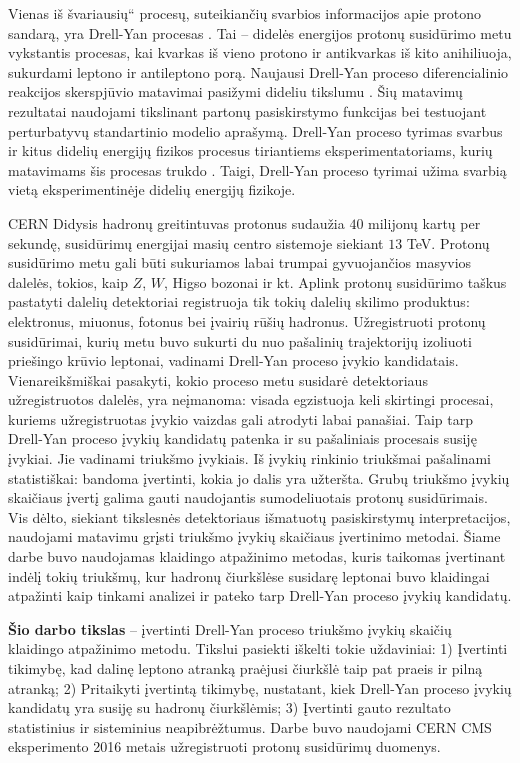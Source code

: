 \documentclass[a4paper, 12pt, oneside]{article}
\newcommand{\ltq}[1]{{\quotedblbase{}#1\textquotedblleft{}}}
\newlength\q
\begin{document}
Vienas iš \ltq{švariausių} procesų, suteikiančių svarbios informacijos apie protono sandarą, yra
Drell-Yan procesas \cite{DYoriginal}.
Tai -- didelės energijos protonų susidūrimo metu vykstantis procesas, kai kvarkas iš vieno protono ir antikvarkas
iš kito anihiliuoja, sukurdami leptono ir antileptono porą.
Naujausi Drell-Yan proceso diferencialinio reakcijos skerspjūvio matavimai pasižymi dideliu tikslumu
\cite{DY_CMS2013, DY_ATLAS2013, DY_ATLAS2014, DY_CMS2015, DY_ATLAS2016, DY_ATLAS2017, DY_CMS2019}.
Šių matavimų rezultatai naudojami tikslinant partonų pasiskirstymo funkcijas bei testuojant perturbatyvų standartinio
modelio aprašymą.
Drell-Yan proceso tyrimas svarbus ir kitus didelių energijų fizikos procesus tiriantiems eksperimentatoriams,
kurių matavimams šis procesas trukdo \cite{Higgs2018, Zprime, SUSYtau}.
Taigi, Drell-Yan proceso tyrimai užima svarbią vietą eksperimentinėje didelių energijų fizikoje.

CERN Didysis hadronų greitintuvas protonus sudaužia $40$ milijonų kartų per sekundę, susidūrimų energijai masių
centro sistemoje siekiant $13$ TeV.
Protonų susidūrimo metu gali būti sukuriamos labai trumpai gyvuojančios masyvios dalelės, tokios, kaip
$Z$, $W$, Higso bozonai ir kt.
Aplink protonų susidūrimo taškus pastatyti dalelių detektoriai registruoja tik tokių dalelių skilimo produktus:
elektronus, miuonus, fotonus bei įvairių rūšių hadronus.
Užregistruoti protonų susidūrimai, kurių metu buvo sukurti du nuo pašalinių trajektorijų izoliuoti priešingo krūvio
leptonai, vadinami Drell-Yan proceso įvykio kandidatais.
Vienareikšmiškai pasakyti, kokio proceso metu susidarė detektoriaus užregistruotos dalelės, yra neįmanoma:
visada egzistuoja keli skirtingi procesai, kuriems užregistruotas įvykio vaizdas gali atrodyti labai panašiai.
Taip tarp Drell-Yan proceso įvykių kandidatų patenka ir su pašaliniais procesais susiję įvykiai.
Jie vadinami triukšmo įvykiais.
Iš įvykių rinkinio triukšmai pašalinami statistiškai: bandoma įvertinti, kokia jo dalis yra užteršta.
Grubų triukšmo įvykių skaičiaus įvertį galima gauti naudojantis sumodeliuotais protonų susidūrimais.
Vis dėlto, siekiant tikslesnės detektoriaus išmatuotų pasiskirstymų interpretacijos, naudojami matavimu grįsti
triukšmo įvykių skaičiaus įvertinimo metodai.
Šiame darbe buvo naudojamas klaidingo atpažinimo metodas, kuris taikomas įvertinant indėlį tokių triukšmų, kur
hadronų čiurkšlėse susidarę leptonai buvo klaidingai atpažinti kaip tinkami analizei ir pateko tarp Drell-Yan proceso įvykių kandidatų.

\textbf{Šio darbo tikslas} -- įvertinti Drell-Yan proceso triukšmo įvykių skaičių klaidingo atpažinimo metodu.
Tikslui pasiekti iškelti tokie uždaviniai:
1) Įvertinti tikimybę, kad dalinę leptono atranką praėjusi čiurkšlė taip pat praeis ir pilną atranką;
2) Pritaikyti įvertintą tikimybę, nustatant, kiek Drell-Yan proceso įvykių kandidatų yra susiję su hadronų čiurkšlėmis;
3) Įvertinti gauto rezultato statistinius ir sisteminius neapibrėžtumus.
Darbe buvo naudojami CERN CMS eksperimento 2016 metais užregistruoti protonų susidūrimų duomenys.
\end{document}
